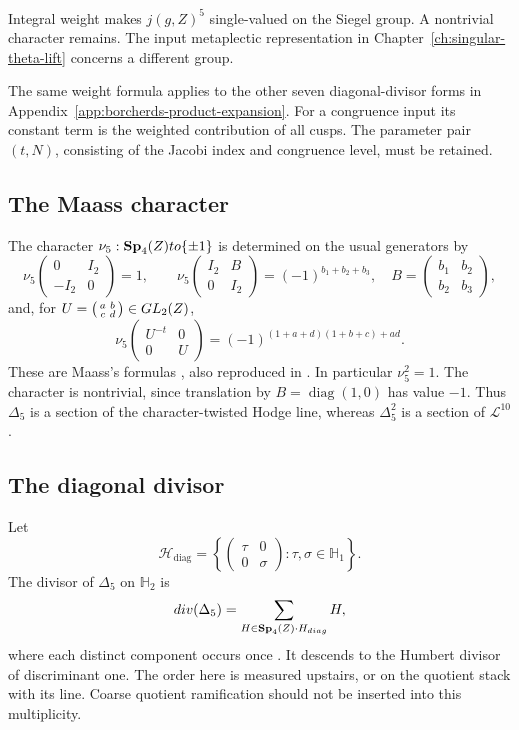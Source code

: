 Integral weight makes \(j(g,Z)^5\) single-valued on the Siegel
group.  A nontrivial character remains.  The input metaplectic
representation in Chapter~\ref{ch:singular-theta-lift} concerns a
different group.

The same weight formula applies to the other seven diagonal-divisor
forms in Appendix~\ref{app:borcherds-product-expansion}.
For a congruence input its constant term is the weighted contribution
of all cusps.  The parameter pair \((t,N)\), consisting of the Jacobi
index and congruence level, must be retained.

\subsection{The Maass character}
\label{ssec:view1-maass-multiplier}

The character \(\nu_5:\mathbf{Sp}_4(Z)to\{\pm1\}\) is determined on
the usual generators by
\[
 \nu_5\begin{pmatrix}0&I_2\\-I_2&0\end{pmatrix}=1,\qquad
 \nu_5\begin{pmatrix}I_2&B\\0&I_2\end{pmatrix}
       =(-1)^{b_1+b_2+b_3},
 \quad B=\begin{pmatrix}b_1&b_2\\b_2&b_3\end{pmatrix},
\]
and, for \(U=\bigl(\begin{smallmatrix}a&b\\c&d\end{smallmatrix}\bigr)
\in GL_2(Z)\),
\[
 \nu_5\begin{pmatrix}U^{-t}&0\\0&U\end{pmatrix}
 =(-1)^{(1+a+d)(1+b+c)+ad}.
\]
These are Maass's formulas \cite{MAASS:1}, also reproduced in
\cite[(1.3)--(1.5)]{GN}.
In particular \(\nu_5^2=1\).
The character is nontrivial, since translation by
\(B=\operatorname{diag}(1,0)\) has value \(-1\).
Thus \(\Delta_5\) is a section of the character-twisted Hodge line,
whereas \(\Delta_5^2\) is a section of \(\mathcal L^{10}\).

\subsection{The diagonal divisor}
\label{ssec:view1-diagonal-divisor}

Let
\[
 \mathcal H_{\mathrm{diag}}
 =\left\{\begin{pmatrix}\tau&0\\0&\sigma\end{pmatrix}:
                         \tau,\sigma\in\mathbb H_1\right\}.
\]
The divisor of \(\Delta_5\) on \(\mathbb H_2\) is
\[
 div(\Delta_5)
 =\sum_{H\in\mathbf{Sp}_4(Z)\cdot H_{diag}}
       H,
\]
where each distinct component occurs once
\cite[Theorem 1.4]{GC}.  It descends to the Humbert divisor of
discriminant one.  The order here is measured upstairs, or on the
quotient stack with its line.  Coarse quotient ramification should
not be inserted into this multiplicity.


